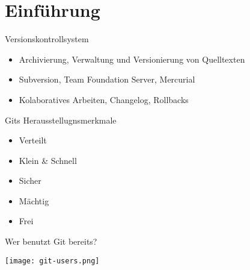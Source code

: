 

\frame{
    \titlepage
}

\section{Einführung}

\begin{frame}{Versionskontrollsystem}
    \begin{itemize}[<+->]
        \item Archivierung, Verwaltung und Versionierung von Quelltexten
        \item Subversion, Team Foundation Server, Mercurial
        \item Kolaboratives Arbeiten, Changelog, Rollbacks
    \end{itemize}
\end{frame}

\begin{frame}{Gits Herausstellugnsmerkmale}
    \begin{itemize}[<+->]
        \item \alert<6>{Verteilt}
        \item Klein \& Schnell
        \item \alert<6>{Sicher}
        \item \alert<6>{Mächtig}
        \item Frei
    \end{itemize}
\end{frame}

\begin{frame}{Wer benutzt Git bereits?}
    \centerline{\texttt{[image: git-users.png]}}
\end{frame}

